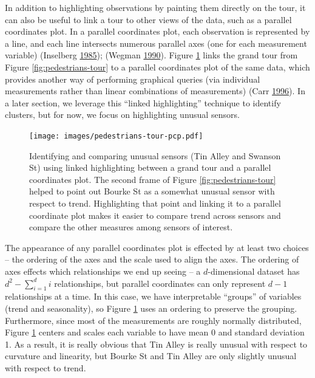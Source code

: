 \documentclass[12pt,]{isuthesis}
\begin{document}
In addition to highlighting observations by painting them directly on
the tour, it can also be useful to link a tour to other views of the
data, such as a parallel coordinates plot. In a parallel coordinates
plot, each observation is represented by a line, and each line
intersects numerous parallel axes (one for each measurement variable)
(Inselberg \protect\hyperlink{ref-Inselberg:85}{1985}); (Wegman
\protect\hyperlink{ref-Wegman:90}{1990}). Figure
\ref{fig:pedestrians-tour-pcp} links the grand tour from Figure
\ref{fig:pedestrians-tour} to a parallel coordinates plot of the same
data, which provides another way of performing graphical queries (via
individual measurements rather than linear combinations of measurements)
(Carr \protect\hyperlink{ref-brushing-pcp}{1996}). In a later section,
we leverage this ``linked highlighting'' technique to identify clusters,
but for now, we focus on highlighting unusual sensors.

\begin{figure}
\centering
\texttt{[image: images/pedestrians-tour-pcp.pdf]}
\caption{\label{fig:pedestrians-tour-pcp}Identifying and comparing unusual
sensors (Tin Alley and Swanson St) using linked highlighting between a
grand tour and a parallel coordinates plot. The second frame of Figure
\ref{fig:pedestrians-tour} helped to point out Bourke St as a somewhat
unusual sensor with respect to trend. Highlighting that point and
linking it to a parallel coordinate plot makes it easier to compare
trend across sensors and compare the other measures among sensors of
interest.}
\end{figure}

The appearance of any parallel coordinates plot is effected by at least
two choices -- the ordering of the axes and the scale used to align the
axes. The ordering of axes effects which relationships we end up seeing
-- a \(d\)-dimensional dataset has \(d^2 - \sum_{i=1}^d i\)
relationships, but parallel coordinates can only represent \(d-1\)
relationships at a time. In this case, we have interpretable ``groups''
of variables (trend and seasonality), so Figure
\ref{fig:pedestrians-tour-pcp} uses an ordering to preserve the
grouping. Furthermore, since most of the measurements are roughly
normally distributed, Figure \ref{fig:pedestrians-tour-pcp} centers and
scales each variable to have mean 0 and standard deviation 1. As a
result, it is really obvious that Tin Alley is really unusual with
respect to curvature and linearity, but Bourke St and Tin Alley are only
slightly unusual with respect to trend.
\end{document}
